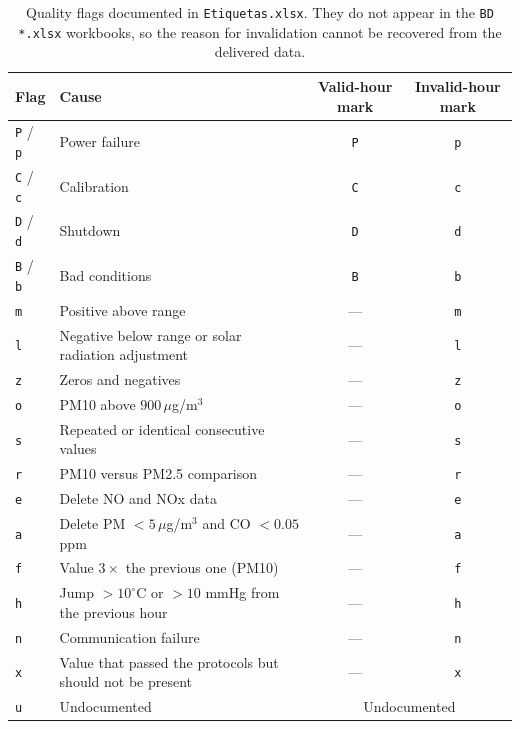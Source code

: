 \begin{table}[pos=t]
  \centering
  \caption{Quality flags documented in \texttt{Etiquetas.xlsx}. They do not
    appear in the \texttt{BD *.xlsx} workbooks, so the reason for
    invalidation cannot be recovered from the delivered data.}
  \label{tab:dic-banderas}
  \small
  \begin{tabular}{llcc}
    \toprule
    Flag & Cause & Valid-hour mark & Invalid-hour mark \\
    \midrule
    \texttt{P} / \texttt{p} & Power failure                                      & \texttt{P} & \texttt{p} \\
    \texttt{C} / \texttt{c} & Calibration                                        & \texttt{C} & \texttt{c} \\
    \texttt{D} / \texttt{d} & Shutdown                                           & \texttt{D} & \texttt{d} \\
    \texttt{B} / \texttt{b} & Bad conditions                                     & \texttt{B} & \texttt{b} \\
    \texttt{m}              & Positive above range                               & ---        & \texttt{m} \\
    \texttt{l}              & Negative below range or solar radiation adjustment & ---        & \texttt{l} \\
    \texttt{z}              & Zeros and negatives                                & ---        & \texttt{z} \\
    \texttt{o}              & PM10 above $900\,\mu$g/m$^3$                       & ---        & \texttt{o} \\
    \texttt{s}              & Repeated or identical consecutive values           & ---        & \texttt{s} \\
    \texttt{r}              & PM10 versus PM2.5 comparison                       & ---        & \texttt{r} \\
    \texttt{e}              & Delete NO and NOx data                             & ---        & \texttt{e} \\
    \texttt{a}              & Delete PM $<5\,\mu$g/m$^3$ and CO $<0.05$ ppm      & ---        & \texttt{a} \\
    \texttt{f}              & Value $3\times$ the previous one (PM10)            & ---        & \texttt{f} \\
    \texttt{h}              & Jump $>10^{\circ}$C or $>10$ mmHg from the previous hour & --- & \texttt{h} \\
    \texttt{n}              & Communication failure                              & ---        & \texttt{n} \\
    \texttt{x}              & Value that passed the protocols but should not be present & --- & \texttt{x} \\
    \texttt{u}              & Undocumented                                       & \multicolumn{2}{c}{Undocumented} \\
    \bottomrule
  \end{tabular}
\end{table}

